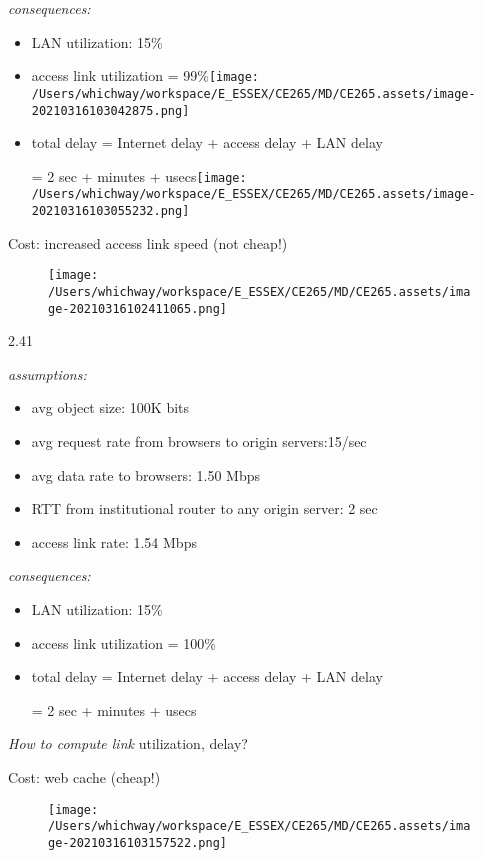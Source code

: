\documentclass[
]{article}
\begin{document}
\emph{consequences:}

\begin{itemize}
\item
  LAN utilization: 15\%
\item
  access link utilization =
  99\%\texttt{[image: /Users/whichway/workspace/E\_ESSEX/CE265/MD/CE265.assets/image-20210316103042875.png]}
\item
  total delay = Internet delay + access delay + LAN delay

  = 2 sec + minutes +
  usecs\texttt{[image: /Users/whichway/workspace/E\_ESSEX/CE265/MD/CE265.assets/image-20210316103055232.png]}
\end{itemize}

Cost: increased access link speed (not cheap!)

\begin{figure}
\centering
\texttt{[image: /Users/whichway/workspace/E\_ESSEX/CE265/MD/CE265.assets/image-20210316102411065.png]}
\caption{}
\end{figure}

2.41

\emph{assumptions:}

\begin{itemize}
\item
  avg object size: 100K bits
\item
  avg request rate from browsers to origin servers:15/sec
\item
  avg data rate to browsers: 1.50 Mbps
\item
  RTT from institutional router to any origin server: 2 sec
\item
  access link rate: 1.54 Mbps
\end{itemize}

\emph{consequences:}

\begin{itemize}
\item
  LAN utilization: 15\%
\item
  access link utilization = 100\%
\item
  total delay = Internet delay + access delay + LAN delay

  = 2 sec + minutes + usecs
\end{itemize}

\emph{How to compute link} utilization, delay?

Cost: web cache (cheap!)

\begin{figure}
\centering
\texttt{[image: /Users/whichway/workspace/E\_ESSEX/CE265/MD/CE265.assets/image-20210316103157522.png]}
\caption{}
\end{figure}
\end{document}
